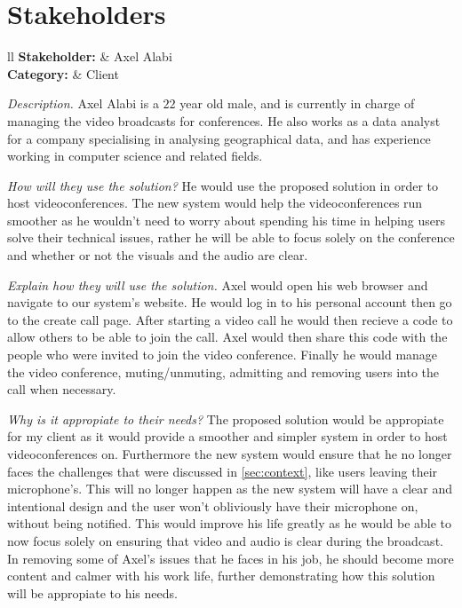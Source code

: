 \section{Stakeholders}
\label{sec:stakeholders}

\begin{tblr}{ll}
  \textsf{\bfseries Stakeholder: } & Axel Alabi\\
  \textsf{\bfseries Category: } & Client\\
\end{tblr}
\vspace{0.2cm}

\textit{Description.} %
Axel Alabi is a $22$ year old male, and is currently in charge 
of managing the video broadcasts for conferences. He also
works as a data analyst for a company specialising in analysing
geographical data, and has experience working in computer 
science and related fields. \vspace{0.2cm}

\textit{How will they use the solution?} %
He would use the proposed solution in order to host
videoconferences. The new system would help the 
videoconferences run smoother as he wouldn't need to worry 
about spending his time in helping users solve their technical
issues, rather he will be able to focus solely on the
conference and whether or not the visuals and the audio are
clear. \vspace{0.2cm}

\textit{Explain how they will use the solution.}
Axel would open his web browser and navigate to our system's
website. He would log in to his personal account then go to
the create call page. After starting a video call he would 
then recieve a code to allow others to be able to join the
call. Axel would then share this code with the people who
were invited to join the video conference. Finally he would 
manage the video conference, muting/unmuting, admitting 
and removing users into the call when necessary.
\vspace{0.2cm}

\textit{Why is it appropiate to their needs?} %
The proposed solution would be appropiate for my client as it
would provide a smoother and simpler system in order to host 
videoconferences on. Furthermore the new system would ensure
that he no longer faces the challenges that were discussed
in \ref{sec:context}, like users leaving their microphone's.
This will no longer happen as the new system will have a 
clear and intentional design and the user won't obliviously 
have their microphone on, without being notified. This would 
improve his life greatly as he would be able to now focus 
solely on ensuring that video and audio is clear during the 
broadcast. In removing some of Axel's issues that he faces in
his job, he should become more content and calmer with his
work life, further demonstrating how this solution will be 
appropiate to his needs.
\vspace{0.2cm}


